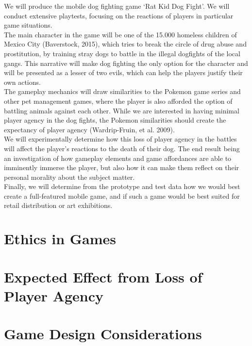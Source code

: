 \documentclass[preprint,12pt, authoryear]{elsarticle}
\begin{document}
We will produce the mobile dog fighting game ‘Rat Kid Dog Fight’. We will conduct extensive playtests, focusing on the reactions of players in particular game situations.\\

The main character in the game will be one of the 15.000 homeless children of Mexico City (Baverstock, 2015), which tries to break the circle of drug abuse and prostitution, by training stray dogs to battle in the illegal dogfights of the local gangs. This narrative will make dog fighting the only option for the character and will be presented as a lesser of two evils, which can help the players justify their own actions. \\

The gameplay mechanics will draw similarities to the Pokemon game series and other pet management games, where the player is also afforded the option of battling animals against each other. While we are interested in having minimal player agency in the dog fights, the Pokemon similarities should create the expectancy of player agency (Wardrip-Fruin, et al. 2009). \\

We will experimentally determine how this loss of player agency in the battles will affect the player’s reactions to the death of their dog. The end result being an investigation of how gameplay elements and game affordances are able to imminently immerse the player, but also how it can make them reflect on their personal morality about the subject matter.\\

Finally, we will determine from the prototype and test data how we would best create a full-featured mobile game, and if such a game would be best suited for retail distribution or art exhibitions.\\

\section{Ethics in Games}
\label{Ethics}


\section{Expected Effect from Loss of Player Agency}
\label{Agency}


\section{Game Design Considerations}
\label{Design}

\end{document}

